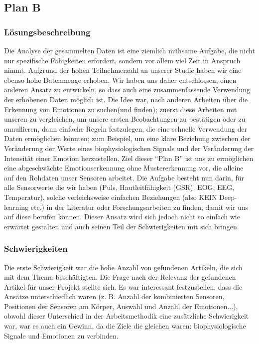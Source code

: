 \subsection{Plan B} \label{plan-b-4}


\subsubsection{Lösungsbeschreibung}

Die Analyse der gesammelten Daten ist eine ziemlich mühsame Aufgabe, die nicht nur spezifische Fähigkeiten erfordert, sondern vor allem viel Zeit in Anspruch nimmt. 
Aufgrund der hohen Teilnehmerzahl an unserer Studie haben wir eine ebenso hohe Datenmenge erhoben. 
Wir haben uns daher entschlossen, einen anderen Ansatz zu entwickeln, so dass auch eine zusammenfassende Verwendung der erhobenen Daten möglich ist. 
Die Idee war, nach anderen Arbeiten über die Erkennung von Emotionen zu suchen(und finden); 
zuerst diese Arbeiten mit unseren zu vergleichen, um unsere ersten Beobachtungen zu bestätigen oder zu annullieren, dann einfache Regeln festzulegen, die eine schnelle Verwendung der Daten ermöglichen könnten; 
zum Beispiel, um eine klare Beziehung zwischen der Veränderung der Werte eines biophysiologischen Signals und der Veränderung der Intensität einer Emotion herzustellen. 
Ziel dieser ``Plan B'' ist uns zu ermöglichen eine abgeschwächte Emotionserkennung ohne Mustererkennung vor, die alleine auf den Rohdaten unser Sensoren arbeitet. 
Die Aufgabe besteht nun darin, für alle Sensorwerte die wir haben (Puls, Hautleitfähigkeit (GSR), EOG, EEG, Temperatur), solche verleichsweise einfachen Beziehungen (also KEIN Deep-learning etc.) in der Literatur oder Forschungsarbeiten zu finden, damit wir uns auf diese berufen können. 
Dieser Ansatz wird sich jedoch nicht so einfach wie erwartet gestalten und auch seinen Teil der Schwierigkeiten mit sich bringen. \\


\subsubsection{Schwierigkeiten}

Die erste Schwierigkeit war die hohe Anzahl von gefundenen Artikeln, die sich mit dem Thema beschäftigten. 
Die Frage nach der Relevanz der gefundenen Artikel für unser Projekt stellte sich. 
Es war interessant festzustellen, dass die Ansätze unterschiedlich waren (z. B. Anzahl der kombinierten Sensoren, Positionen der Sensoren am Körper, Auswahl und Anzahl der Emotionen...), obwohl dieser Unterschied in der Arbeitsmethodik eine zusätzliche Schwierigkeit war, war es auch ein Gewinn, da die Ziele die gleichen waren:
biophysiologische Signale und Emotionen zu verbinden. \\


